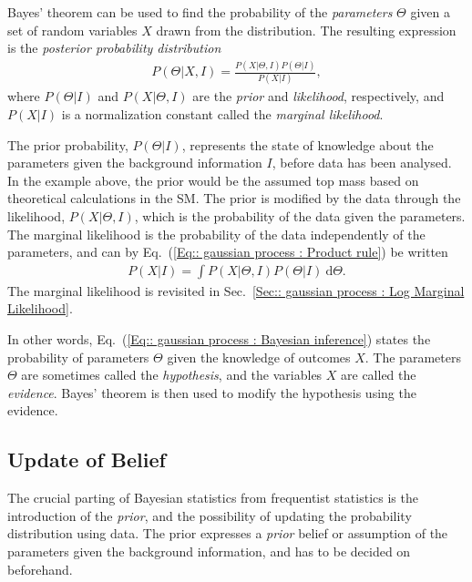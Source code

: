 \documentclass[twoside,english]{uiofysmaster}
\begin{document}
{{Bayes' theorem can be used to find the probability of the \textit{parameters} $\Theta$ given a set of random variables  $X$ drawn from the distribution. The resulting expression is the \textit{posterior probability distribution}
\begin{align}\label{Eq:: gaussian process : Bayesian inference}
P(\Theta | X , I) = \frac{P(X|\Theta, I) P(\Theta| I)}{P(X | I)},
\end{align}
where $P(\Theta | I)$  and $P(X |\Theta, I)$ are the \textit{prior} and \textit{likelihood}, respectively, and $P(X|I)$ is a normalization constant called the \textit{marginal likelihood}. 

The prior probability, $P(\Theta | I)$, represents the state of knowledge about the parameters given the background information $I$, before data has been analysed. In the example above, the prior would be the assumed top mass based on theoretical calculations in the SM. The prior is modified by the data through the likelihood, $P(X |\Theta, I)$, which is the probability of the data given the parameters.  The marginal likelihood is the probability of the data independently of the parameters, and can by Eq.~(\ref{Eq:: gaussian process : Product rule}) be written
\begin{align}
P(X|I) = \int P(X| \Theta, I) P(\Theta | I)~ \text{d} \Theta.
\end{align}
The marginal likelihood is revisited in Sec.~\ref{Sec:: gaussian process : Log Marginal Likelihood}.

In other words, Eq.~(\ref{Eq:: gaussian process : Bayesian inference}) states the probability of parameters $\Theta$ given the knowledge of outcomes $X$. The parameters $\Theta$ are sometimes called the \textit{hypothesis}, and the variables $X$ are called the \textit{evidence}. Bayes' theorem is then used to modify the hypothesis using the evidence. 



\subsection{Update of Belief}\label{Sec:: gaussian process : Priors and Likelihood}

The crucial parting of Bayesian statistics from frequentist statistics is the introduction of the \textit{prior}, and the possibility of updating the probability distribution using data. The prior expresses a \textit{prior} belief or assumption of the parameters given the background information, and has to be decided on beforehand. 

}}
\end{document}
